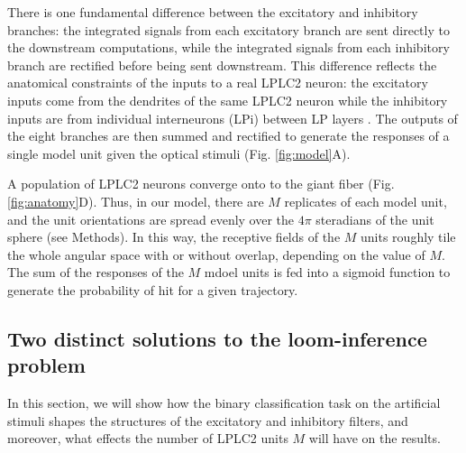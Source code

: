 \documentclass[pdftex,9pt,lineno]{elife}
\begin{document}
There is one fundamental difference between the excitatory and inhibitory branches: the integrated signals from each excitatory branch are sent directly to the downstream computations, while the integrated signals from each inhibitory branch are rectified before being sent downstream. This difference reflects the anatomical constraints of the inputs to a real LPLC2 neuron: the excitatory inputs come from the dendrites of the same LPLC2 neuron while the inhibitory inputs are from individual interneurons (LPi) between LP layers \citep{mauss2015neural,klapoetke2017ultra}. The outputs of the eight branches are then summed and rectified to generate the responses of a single model unit given the optical stimuli (Fig. \ref{fig:model}A).

A population of LPLC2 neurons converge onto to the giant fiber (Fig. \ref{fig:anatomy}D). Thus, in our model, there are $M$ replicates of each model unit, and the unit orientations are spread evenly over the $4\pi$ steradians of the unit sphere (see Methods). In this way, the receptive fields of the $M$ units roughly  tile the whole angular space with or without overlap, depending on the value of $M$. The sum of the responses of the $M$ mdoel units is fed into a sigmoid function to generate the probability of hit for a given trajectory.



\subsection{Two distinct solutions to the loom-inference problem}





In this section, we will show how the binary classification task on the artificial stimuli shapes the structures of the excitatory and inhibitory filters, and moreover, what effects the number of LPLC2 units $M$ will have on the results.
\end{document}
